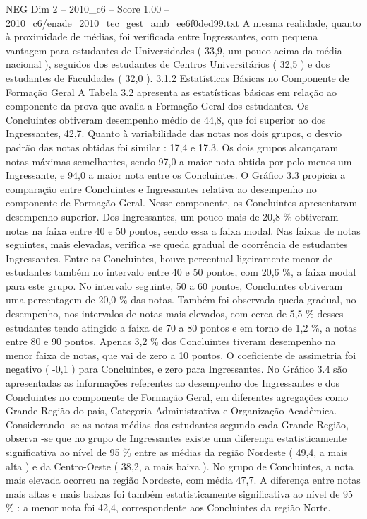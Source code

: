 \begin{textsample}{NEG Dim 2 – 2010\_c6 – Score 1.00 – 2010\_c6/enade\_2010\_tec\_gest\_amb\_ee6f0ded99.txt}
A mesma realidade, quanto à proximidade de médias, foi verificada entre Ingressantes, com pequena vantagem para estudantes de Universidades ( 33,9, um pouco acima da média nacional ), seguidos dos estudantes de Centros Universitários ( 32,5 ) e dos estudantes de Faculdades ( 32,0 ). 3.1.2 Estatísticas Básicas no Componente de Formação Geral A Tabela 3.2 apresenta as estatísticas básicas em relação ao componente da prova que avalia a Formação Geral dos estudantes.
Os Concluintes obtiveram desempenho médio de 44,8, que foi superior ao dos Ingressantes, 42,7.
Quanto à variabilidade das notas nos dois grupos, o desvio padrão das notas obtidas foi similar : 17,4 e 17,3.
Os dois grupos alcançaram notas máximas semelhantes, sendo 97,0 a maior nota obtida por pelo menos um Ingressante, e 94,0 a maior nota entre os Concluintes.
O Gráfico 3.3 propicia a comparação entre Concluintes e Ingressantes relativa ao desempenho no componente de Formação Geral.
Nesse componente, os Concluintes apresentaram desempenho superior.
Dos Ingressantes, um pouco mais de 20,8 \% obtiveram notas na faixa entre 40 e 50 pontos, sendo essa a faixa modal.
Nas faixas de notas seguintes, mais elevadas, verifica -se queda gradual de ocorrência de estudantes Ingressantes.
Entre os Concluintes, houve percentual ligeiramente menor de estudantes também no intervalo entre 40 e 50 pontos, com 20,6 \%, a faixa modal para este grupo.
No intervalo seguinte, 50 a 60 pontos, Concluintes obtiveram uma percentagem de 20,0 \% das notas.
Também foi observada queda gradual, no desempenho, nos intervalos de notas mais elevados, com cerca de 5,5 \% desses estudantes tendo atingido a faixa de 70 a 80 pontos e em torno de 1,2 \%, a notas entre 80 e 90 pontos.
Apenas 3,2 \% dos Concluintes tiveram desempenho na menor faixa de notas, que vai de zero a 10 pontos.
O coeficiente de assimetria foi negativo ( -0,1 ) para Concluintes, e zero para Ingressantes.
No Gráfico 3.4 são apresentadas as informações referentes ao desempenho dos Ingressantes e dos Concluintes no componente de Formação Geral, em diferentes agregações como Grande Região do país, Categoria Administrativa e Organização Acadêmica.
Considerando -se as notas médias dos estudantes segundo cada Grande Região, observa -se que no grupo de Ingressantes existe uma diferença estatisticamente significativa ao nível de 95 \% entre as médias da região Nordeste ( 49,4, a mais alta ) e da Centro-Oeste ( 38,2, a mais baixa ).
No grupo de Concluintes, a nota mais elevada ocorreu na região Nordeste, com média 47,7.
A diferença entre notas mais altas e mais baixas foi também estatisticamente significativa ao nível de 95 \% : a menor nota foi 42,4, correspondente aos Concluintes da região Norte.

\end{textsample}
